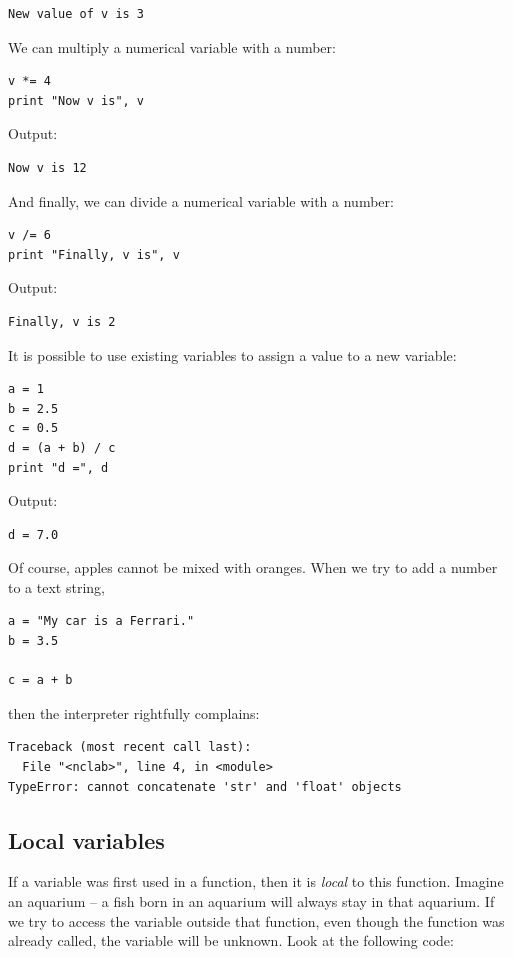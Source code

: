 \documentclass[article,A4,12pt]{llncs}
\begin{document}
\begin{verbatim}
New value of v is 3
\end{verbatim}
We can multiply a numerical variable with a number:

\begin{verbatim}
v *= 4
print "Now v is", v
\end{verbatim}
Output:

\begin{verbatim}
Now v is 12
\end{verbatim}
And finally, we can divide a numerical variable with a number:

\begin{verbatim}
v /= 6
print "Finally, v is", v
\end{verbatim}
Output:

\begin{verbatim}
Finally, v is 2
\end{verbatim}
It is possible to use existing variables to assign a value to a new variable:

\begin{verbatim}
a = 1
b = 2.5
c = 0.5
d = (a + b) / c
print "d =", d
\end{verbatim}
Output:

\begin{verbatim}
d = 7.0
\end{verbatim}
Of course, apples cannot be mixed with oranges. When we try to 
add a number to a text string,

\begin{verbatim}
a = "My car is a Ferrari."
b = 3.5

c = a + b
\end{verbatim}
then the interpreter rightfully complains:

\begin{verbatim}
Traceback (most recent call last):
  File "<nclab>", line 4, in <module>
TypeError: cannot concatenate 'str' and 'float' objects
\end{verbatim}


\subsection{Local variables}

If a variable was first used in a function, then it is {\em local} to this 
function. Imagine an aquarium -- a fish born in an aquarium will always 
stay in that aquarium. If we try to access the variable outside that function,
even though the function was already called, the variable will be unknown. Look
at the following code:
\end{document}
